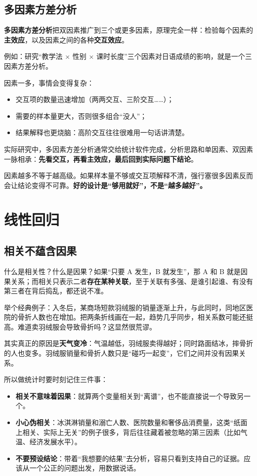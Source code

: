\documentclass[lang=cn,10pt]{elegantbook}
\begin{document}
\section{多因素方差分析}
\textbf{多因素方差分析}把双因素推广到三个或更多因素，原理完全一样：检验每个因素的\textbf{主效应}，以及因素之间的各种\textbf{交互效应}。

例如：研究“教学法 $\times$ 性别 $\times$ 课时长度”三个因素对日语成绩的影响，就是一个三因素方差分析。

因素一多，事情会变得复杂：
\begin{itemize}
  \item 交互项的数量迅速增加（两两交互、三阶交互……）；
  \item 需要的样本量更大，否则很多组合“没人”；
  \item 结果解释也更烧脑：高阶交互往往很难用一句话讲清楚。
\end{itemize}

实际研究中，多因素方差分析通常交给统计软件完成，分析思路和单因素、双因素一脉相承：\textbf{先看交互，再看主效应，最后回到实际问题下结论}。

\begin{remark}
因素越多不等于越高级。如果样本量不够或交互项解释不清，强行塞很多因素反而会让结论变得不可靠。\textbf{好的设计是“够用就好”，不是“越多越好”。}
\end{remark}





\chapter{线性回归}
\section{相关不蕴含因果}
什么是相关性？什么是因果？如果“只要 A 发生，B 就发生”，那 A 和 B 就是因果关系；而相关只表示二者\textbf{存在某种关联}，至于关联有多强、是谁引起谁、有没有第三者在背后捣乱，都还说不准。

举个经典例子：入冬后，某商场短款羽绒服的销量逐渐上升，与此同时，同地区医院的骨折人数也在增加。把两条折线画在一起，趋势几乎同步，相关系数可能还挺高。难道卖羽绒服会导致骨折吗？这显然很荒谬。

其实真正的原因是\textbf{天气变冷}：气温越低，羽绒服卖得越好；同时路面结冰，摔骨折的人也变多。羽绒服销量和骨折人数只是“碰巧一起变”，它们之间并没有因果关系。

所以做统计时要时刻记住三件事：
\begin{itemize}
  \item \textbf{相关不意味着因果}：就算两个变量相关到“离谱”，也不能直接说一个导致另一个。
  \item \textbf{小心伪相关}：冰淇淋销量和溺亡人数、医院数量和奢侈品消费量，这类“纸面上相关、实际上无关”的例子很多，背后往往藏着被忽略的第三因素（比如气温、经济发展水平）。
  \item \textbf{不要预设结论}：带着“我想要的结果”去分析，容易只看到支持自己的证据。应该从一个公正的问题出发，用数据说话。
\end{itemize}
\end{document}

